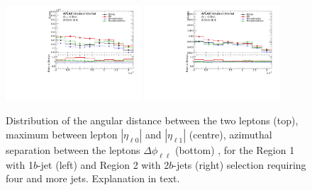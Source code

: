 \begin{figure}[!htb]
\includegraphics[width=0.45\textwidth]{Plots/ttV/c_Region_0_lep_dPhi} 
\includegraphics[width=0.45\textwidth]{Plots/ttV/c_Region_1_lep_dPhi} 
  \caption{Distribution of the angular distance between the two leptons (top), maximum between lepton $|\eta_{\ell 0}|$ and $|\eta_{\ell 1}|$ (centre), azimuthal separation between the leptons $\Delta \phi _{\ell \ell }$ (bottom) , for the Region 1 with 1$b$-jet (left) and Region 2 with 2$b$-jets (right) selection requiring four and more jets. Explanation in text.
   \label{ttV:ll_kin}}
\end{figure}
% 



